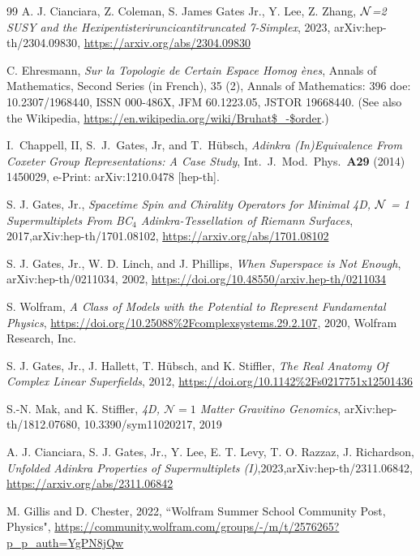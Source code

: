 \documentclass[12pt]{article}
\begin{document}
\begin{thebibliography}{99}
A. J. Cianciara, Z. Coleman, S. James Gates Jr., Y. Lee, Z. Zhang, {\em $\cal N$=2 SUSY and the Hexipentisteriruncicantitruncated 7-Simplex}, {2023}, {arXiv:hep-th/2304.09830}, \url{https://arxiv.org/abs/2304.09830}

 C. Ehresmann, {\em Sur la Topologie de Certain Espace Homog \` enes}, Annals of
Mathematics, Second Series (in French), 35 (2), Annals of Mathematics: 396 doe: 10.2307/1968440, ISSN 000-486X, JFM 60.1223.05, JSTOR 19668440. (See also the Wikipedia, \url{https://en.wikipedia.org/wiki/Bruhat$_-$order}.)

I.\ Chappell, II, S.\ J.\ Gates, Jr, and T.\ H\" ubsch, {\em Adinkra (In)Equivalence From Coxeter 
Group Representations: A Case Study},  Int.\ J.\ Mod.\ Phys.\ {\bf {A29}} (2014) 1450029,
e-Print: arXiv:1210.0478 [hep-th].

S. J. Gates, Jr.,
{\em Spacetime Spin and Chirality Operators for Minimal 4D,
$\cal N$ = 1 Supermultiplets From BC${}_4$ Adinkra-Tessellation of Riemann Surfaces}, {2017},{arXiv:hep-th/1701.08102}, \url{https://arxiv.org/abs/1701.08102}

S. J. Gates, Jr., W. D. Linch, and J. Phillips, {\em When Superspace is Not Enough}, arXiv:hep-th/0211034, 2002,
\url{https://doi.org/10.48550/arxiv.hep-th/0211034}

{S. Wolfram}, {\em A Class of Models with the Potential to Represent Fundamental Physics}, \url{https://doi.org/10.25088\%2Fcomplexsystems.29.2.107}, 2020, {Wolfram Research, Inc.}

S. J. Gates, Jr., J. Hallett, T. H\" ubsch, and K. Stiffler, {\em The Real Anatomy Of Complex Linear Superfields}, 2012, \url{https://doi.org/10.1142\%2Fs0217751x12501436}

S.-N. Mak, and K. Stiffler,
{\em 4D, $\mathcal{N}=1$ Matter Gravitino Genomics}, arXiv:hep-th/1812.07680, 10.3390/sym11020217, 2019


A. J. Cianciara, S. J. Gates, Jr., Y. Lee, E. T. Levy, T. O. Razzaz, J. Richardson, {\em Unfolded Adinkra Properties of Supermultiplets (I)},{2023},{arXiv:hep-th/2311.06842}, \url{https://arxiv.org/abs/2311.06842}

{M. Gillis and D. Chester},
{2022},
``{Wolfram Summer School Community Post, Physics}",
\url{https://community.wolfram.com/groups/-/m/t/2576265?p_p_auth=YgPN8jQw}

\end{thebibliography}
\end{document}
